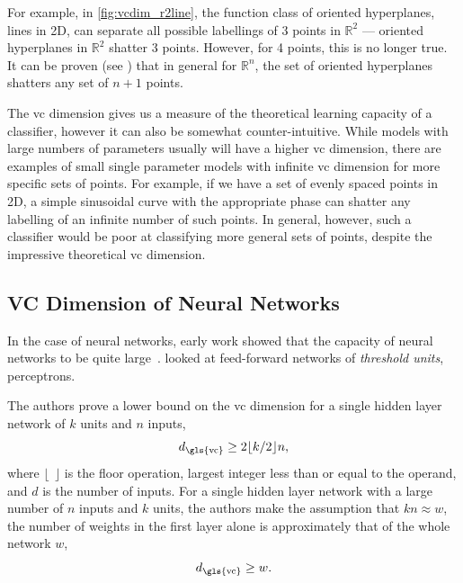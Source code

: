 \documentclass[thesis]{subfiles}
\begin{document}
    For example, in \cref{fig:vcdim_r2line}, the function class of oriented hyperplanes, \ie lines in 2D, can separate all possible labellings of 3 points in $\mathbb{R}^2$ --- oriented hyperplanes in $\mathbb{R}^2$ shatter 3 points. However, for 4 points, this is no longer true. It can be proven (see \citet{burges1998tutorial}) that in general for $\mathbb{R}^n$, the set of oriented hyperplanes shatters any set of $n+1$ points.

    The \gls{vc} dimension gives us a measure of the theoretical learning capacity of a classifier, however it can also be somewhat counter-intuitive. While models with large numbers of parameters usually will have a higher \gls{vc} dimension, there are examples of small single parameter models with infinite \gls{vc} dimension for more specific sets of points. For example, if we have a set of evenly spaced points in 2D, a simple sinusoidal curve with the appropriate phase can shatter any labelling of an infinite number of such points. In general, however, such a classifier would be poor at classifying more general sets of points, despite the impressive theoretical \gls{vc} dimension.
    
    \subsection{VC Dimension of Neural Networks}\label{vcdim}
    In the case of neural networks, early work showed that the capacity of neural networks to be quite large~\citep{hornik89a,baum1989size}. \citet{baum1989size} looked at feed-forward networks of \emph{threshold units}, \ie perceptrons. %
    
    The authors prove a lower bound on the \gls{vc} dimension for a single hidden layer network of $k$ units and $n$ inputs,
    \begin{equation}
        d_{\textrm{\gls{vc}}} \geq 2 \lfloor k/2 \rfloor n,
    \end{equation}
    where $\lfloor \ \ \rfloor$ is the floor operation, \ie largest integer less than or equal to the operand, and $d$ is the number of inputs. For a single hidden layer network with a large number of $n$ inputs and $k$ units, the authors make the assumption that $kn\approx w$, \ie the number of weights in the first layer alone is approximately that of the whole network $w$,
    \begin{equation}
        d_{\textrm{\gls{vc}}} \geq w.
    \end{equation}
\end{document}
